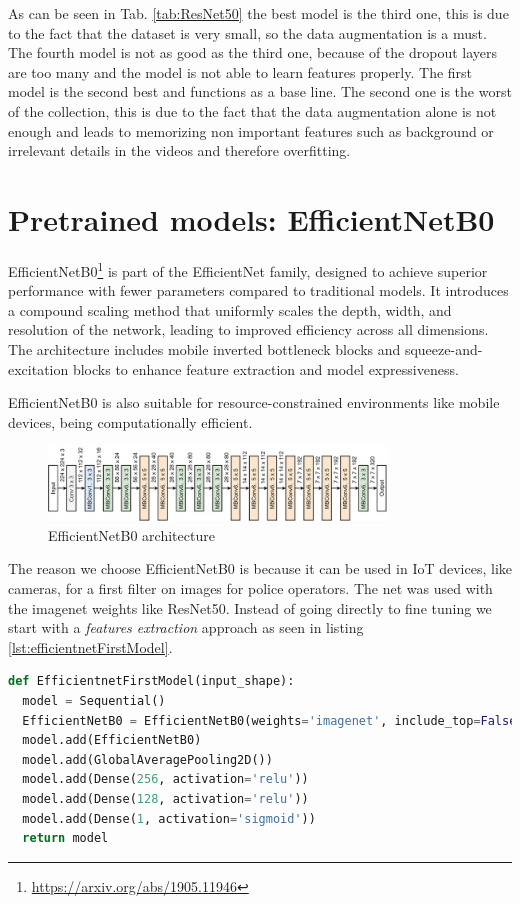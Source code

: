 As can be seen in Tab. \ref{tab:ResNet50} the best model is the third one, this is due to the fact that the dataset is very small, so the data augmentation is a must. The fourth model is not as good as the third one, because of the dropout layers are too many and the model is not able to learn features properly. The first model is the second best and functions as a base line. The second one is the worst of the collection, this is due to the fact that the data augmentation alone is not enough and leads to memorizing non important features such as background or irrelevant details in the videos and therefore overfitting.

\section{Pretrained models: EfficientNetB0}
EfficientNetB0\footnote{\url{https://arxiv.org/abs/1905.11946}} is part of the EfficientNet family, designed to achieve superior performance with fewer parameters compared to traditional models.
It introduces a compound scaling method that uniformly scales the depth, width, and resolution of the network, leading to improved efficiency across all dimensions.
The architecture includes mobile inverted bottleneck blocks and squeeze-and-excitation blocks to enhance feature extraction and model expressiveness.

EfficientNetB0 is also suitable for resource-constrained environments like mobile devices, being computationally efficient. 
\begin{figure}[h!]
    \centering
    \includegraphics[width=0.8\textwidth]{images/EfficientNetB0-architecture-36.png}
    \caption{EfficientNetB0 architecture}
    \label{fig:EfficientNetB0architecture}
\end{figure}

The reason we choose EfficientNetB0 is because it can be used in IoT devices, like cameras, for a first filter on images for police operators. The net was used with the imagenet weights like ResNet50.
Instead of going directly to fine tuning we start with a \textit{features extraction} approach as seen in listing \ref{lst:efficientnetFirstModel}.
\pagebreak
\begin{lstlisting}[language=python, caption={EfficientNetB0 first model}, label={lst:efficientnetFirstModel}]
def EfficientnetFirstModel(input_shape):
  model = Sequential()
  EfficientNetB0 = EfficientNetB0(weights='imagenet', include_top=False, input_shape=input_shape)
  model.add(EfficientNetB0)
  model.add(GlobalAveragePooling2D())
  model.add(Dense(256, activation='relu'))
  model.add(Dense(128, activation='relu'))
  model.add(Dense(1, activation='sigmoid'))
  return model
\end{lstlisting}

